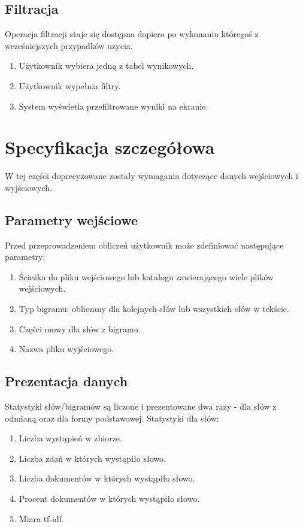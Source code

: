 \documentclass[11pt]{article}
\begin{document}
\subsection{Filtracja}
Operacja filtracji staje się dostępna dopiero po wykonaniu któregoś z wcześniejszych przypadków użycia.
\begin{enumerate}
 \item Użytkownik wybiera jedną z tabel wynikowych.
 \item Użytkownik wypełnia filtry.
 \item System wyświetla przefiltrowane wyniki na ekranie.
\end{enumerate}

\section{Specyfikacja szczegółowa}
W tej części doprecyzowane zostały wymagania dotyczące danych wejściowych i wyjściowych.
\subsection{Parametry wejściowe}
Przed przeprowadzeniem obliczeń użytkownik może zdefiniować następujące parametry:
\begin{enumerate}
 \item Ścieżka do pliku wejściowego lub katalogu zawierającego wiele plików wejściowych.
 \item Typ bigramu: obliczany dla kolejnych słów lub wszystkich słów w tekście.
 \item Części mowy dla słów z bigramu.
 \item Nazwa pliku wyjściowego.
\end{enumerate}

\subsection{Prezentacja danych}
Statystyki słów/bigramów są liczone i prezentowane dwa razy - dla słów z odmianą oraz dla formy podstawowej.
Statystyki dla słów:
\begin{enumerate}
 \item Liczba wystąpień w zbiorze.
 \item Liczba zdań w których wystąpiło słowo.
 \item Liczba dokumentów w których wystąpiło słowo.
 \item Procent dokumentów w których wystąpiło słowo.
 \item Miara tf-idf.
\end{enumerate}
\end{document}
